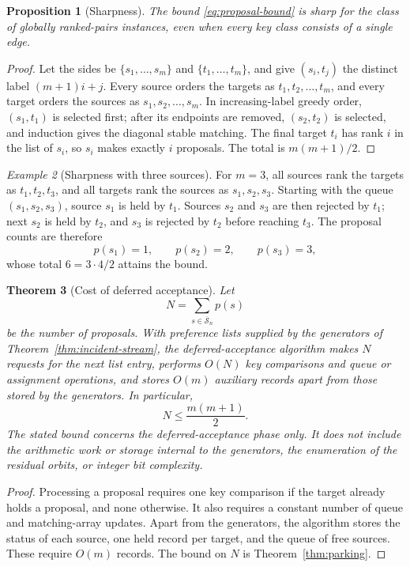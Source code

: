 \documentclass[11pt]{amsart}
\newtheorem{theorem}{Theorem}[section]
\newtheorem{proposition}[theorem]{Proposition}
\theoremstyle{definition}
\theoremstyle{remark}
\newtheorem{example}[theorem]{Example}
\newcommand{\Sbar}{\overline{\mathcal S}_n}
\begin{document}
\begin{proposition}[Sharpness]\label{prop:sharpness}
The bound \eqref{eq:proposal-bound} is sharp for the class of globally
ranked-pairs instances, even when every key class consists of a single edge.
\end{proposition}

\begin{proof}
Let the sides be $\{s_1,\ldots,s_m\}$ and $\{t_1,\ldots,t_m\}$, and give
$(s_i,t_j)$ the distinct label $(m+1)i+j$.  Every source orders the targets as
$t_1,t_2,\ldots,t_m$, and every target orders the sources as
$s_1,s_2,\ldots,s_m$.  In increasing-label greedy order, $(s_1,t_1)$ is
selected first; after its endpoints are removed, $(s_2,t_2)$ is selected,
and induction gives the diagonal stable matching.  The final target $t_i$ has
rank $i$ in the list of $s_i$, so $s_i$ makes exactly $i$ proposals.  The
total is $m(m+1)/2$.
\end{proof}

\begin{example}[Sharpness with three sources]
For $m=3$, all sources rank the targets as $t_1,t_2,t_3$, and all targets
rank the sources as $s_1,s_2,s_3$.  Starting with the queue
$(s_1,s_2,s_3)$, source $s_1$ is held by $t_1$.  Sources $s_2$ and $s_3$ are
then rejected by $t_1$; next $s_2$ is held by $t_2$, and $s_3$ is rejected by
$t_2$ before reaching $t_3$.  The proposal counts are therefore
\[
 p(s_1)=1,
 \qquad p(s_2)=2,
 \qquad p(s_3)=3,
\]
whose total $6=3\cdot4/2$ attains the bound.
\end{example}

\begin{theorem}[Cost of deferred acceptance]
\label{thm:complexity}
Let
\[
 N=\sum_{s\in\Sbar}p(s)
\]
be the number of proposals.  With preference lists supplied by the generators
of Theorem~\ref{thm:incident-stream}, the deferred-acceptance algorithm makes
$N$ requests for the next list entry, performs $O(N)$ key comparisons and
queue or assignment operations, and stores $O(m)$ auxiliary records apart
from those stored by the generators.
In particular,
\[
 N\le\frac{m(m+1)}2.
\]
The stated bound concerns the deferred-acceptance phase only.  It does not
include the arithmetic work or storage internal to the generators, the
enumeration of the residual orbits, or integer bit complexity.
\end{theorem}

\begin{proof}
Processing a proposal requires one key comparison if the target already
holds a proposal, and none otherwise.  It also requires a constant number of
queue and matching-array updates.  Apart from the generators, the algorithm
stores the status of each source, one held record per target, and the queue
of free sources.  These require $O(m)$ records.  The bound on $N$ is
Theorem~\ref{thm:parking}.
\end{proof}
\end{document}
